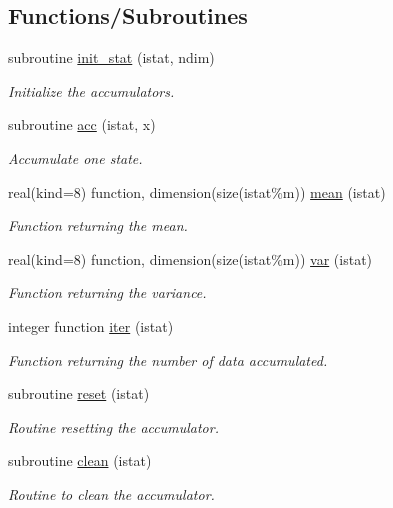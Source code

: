 \subsection*{Functions/\+Subroutines}
\begin{DoxyCompactItemize}
\item 
subroutine \hyperlink{namespacestat_a5cf2b5befc54e196ab5d421b225d77a6}{init\+\_\+stat} (istat, ndim)
\begin{DoxyCompactList}\small\item\em Initialize the accumulators. \end{DoxyCompactList}\item 
subroutine \hyperlink{namespacestat_a26d1999c47f94156f2c36b0f02901b84}{acc} (istat, x)
\begin{DoxyCompactList}\small\item\em Accumulate one state. \end{DoxyCompactList}\item 
real(kind=8) function, dimension(size(istat\%m)) \hyperlink{namespacestat_acb86e45d7c525e6e01b0e1b1c68ebe50}{mean} (istat)
\begin{DoxyCompactList}\small\item\em Function returning the mean. \end{DoxyCompactList}\item 
real(kind=8) function, dimension(size(istat\%m)) \hyperlink{namespacestat_aa03a5f469d96e4b6448153de00af9d08}{var} (istat)
\begin{DoxyCompactList}\small\item\em Function returning the variance. \end{DoxyCompactList}\item 
integer function \hyperlink{namespacestat_ab9f2cf97135e848680c3d46d9b7df9a9}{iter} (istat)
\begin{DoxyCompactList}\small\item\em Function returning the number of data accumulated. \end{DoxyCompactList}\item 
subroutine \hyperlink{namespacestat_af4db26b95e6378e574313f3cd664c2f2}{reset} (istat)
\begin{DoxyCompactList}\small\item\em Routine resetting the accumulator. \end{DoxyCompactList}\item 
subroutine \hyperlink{namespacestat_a8d7731166fa17cb566ddbf45ac7b2234}{clean} (istat)
\begin{DoxyCompactList}\small\item\em Routine to clean the accumulator. \end{DoxyCompactList}\end{DoxyCompactItemize}


